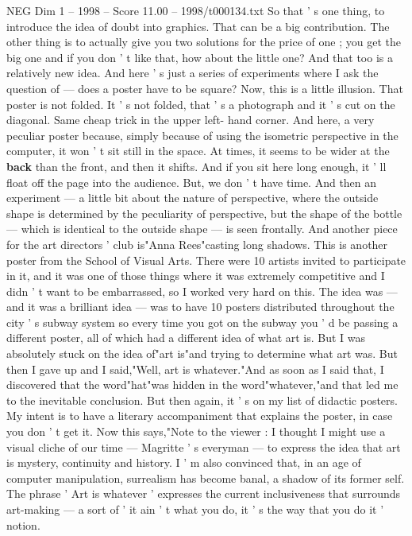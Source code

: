 \begin{textsample}{NEG Dim 1 – 1998 – Score 11.00 – 1998/t000134.txt}
So that ' s one thing, to introduce the idea of doubt into graphics.
That can be a big contribution.
The other thing is to actually give you two solutions for the price of one ; you get the big one and if you don ' t like that, how about the little one?
And that too is a relatively new idea.
And here ' s just a series of experiments where I ask the question of — does a poster have to be square?
Now, this is a little illusion.
That poster is not folded.
It ' s not folded, that ' s a photograph and it ' s cut on the diagonal.
Same cheap trick in the upper left- hand corner.
And here, a very peculiar poster because, simply because of using the isometric perspective in the computer, it won ' t sit still in the space.
At times, it seems to be wider at the \textbf{back} than the front, and then it shifts.
And if you sit here long enough, it ' ll float off the page into the audience.
But, we don ' t have time.
And then an experiment — a little bit about the nature of perspective, where the outside shape is determined by the peculiarity of perspective, but the shape of the bottle — which is identical to the outside shape — is seen frontally.
And another piece for the art directors ' club is"Anna Rees"casting long shadows.
This is another poster from the School of Visual Arts.
There were 10 artists invited to participate in it, and it was one of those things where it was extremely competitive and I didn ' t want to be embarrassed, so I worked very hard on this.
The idea was — and it was a brilliant idea — was to have 10 posters distributed throughout the city ' s subway system so every time you got on the subway you ' d be passing a different poster, all of which had a different idea of what art is.
But I was absolutely stuck on the idea of"art is"and trying to determine what art was.
But then I gave up and I said,"Well, art is whatever."And as soon as I said that, I discovered that the word"hat"was hidden in the word"whatever,"and that led me to the inevitable conclusion.
But then again, it ' s on my list of didactic posters.
My intent is to have a literary accompaniment that explains the poster, in case you don ' t get it.
Now this says,"Note to the viewer : I thought I might use a visual cliche of our time — Magritte ' s everyman — to express the idea that art is mystery, continuity and history.
I ' m also convinced that, in an age of computer manipulation, surrealism has become banal, a shadow of its former self.
The phrase ' Art is whatever ' expresses the current inclusiveness that surrounds art-making — a sort of ' it ain ' t what you do, it ' s the way that you do it ' notion.

\end{textsample}
